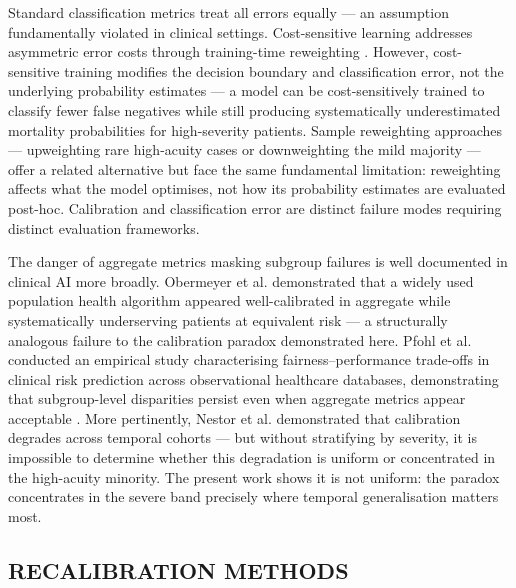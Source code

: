 \documentclass{ieeeaccess}
\begin{document}
Standard classification metrics treat all errors equally — an assumption fundamentally violated in clinical settings. Cost-sensitive learning addresses asymmetric error costs through training-time reweighting \cite{b13}. However, cost-sensitive training modifies the decision boundary and classification error, not the underlying probability estimates — a model can be cost-sensitively trained to classify fewer false negatives while still producing systematically underestimated mortality probabilities for high-severity patients. Sample reweighting approaches — upweighting rare high-acuity cases or downweighting the mild majority — offer a related alternative but face the same fundamental limitation: reweighting affects what the model optimises, not how its probability estimates are evaluated post-hoc. Calibration and classification error are distinct failure modes requiring distinct evaluation frameworks.

The danger of aggregate metrics masking subgroup failures is well documented in clinical AI more broadly. Obermeyer et al. demonstrated that a widely used population health algorithm appeared well-calibrated in aggregate while systematically underserving patients at equivalent risk \cite{b28} — a structurally analogous failure to the calibration paradox demonstrated here. Pfohl et al. conducted an empirical study characterising fairness--performance trade-offs in clinical risk prediction across observational healthcare databases, demonstrating that subgroup-level disparities persist even when aggregate metrics appear acceptable \cite{b30}. More pertinently, Nestor et al. demonstrated that calibration degrades across temporal cohorts \cite{b15} — but without stratifying by severity, it is impossible to determine whether this degradation is uniform or concentrated in the high-acuity minority. The present work shows it is not uniform: the paradox concentrates in the severe band precisely where temporal generalisation matters most.

\subsection{RECALIBRATION METHODS}
\end{document}
